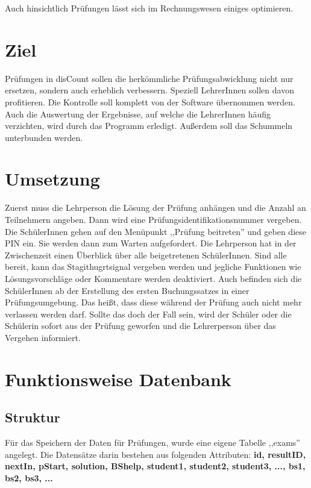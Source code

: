 \documentclass[12pt]{report}
\begin{document}
Auch hinsichtlich Prüfungen lässt sich im Rechnungswesen einiges optimieren.
 
\section{Ziel}
Prüfungen in disCount sollen die herkömmliche Prüfungsabwicklung nicht nur ersetzen, sondern auch erheblich verbessern. Speziell LehrerInnen sollen davon profitieren. Die Kontrolle soll komplett von der Software übernommen werden. Auch die Auswertung der Ergebnisse, auf welche die LehrerInnen häufig verzichten, wird durch das Programm erledigt. Außerdem soll das Schummeln unterbunden werden.
  
\section{Umsetzung}
Zuerst muss die Lehrperson die Lösung der Prüfung anhängen und die Anzahl an Teilnehmern angeben. Dann wird eine Prüfungsidentifikationsnummer vergeben. Die SchülerInnen gehen auf den Menüpunkt ,,Prüfung beitreten'' und geben diese PIN ein. Sie werden dann zum Warten aufgefordert. Die Lehrperson hat in der Zwischenzeit einen Überblick über alle beigetretenen SchülerInnen. Sind alle bereit, kann das Stagithugrtsignal vergeben werden und jegliche Funktionen wie Lösungsvorschläge oder Kommentare werden deaktiviert. Auch befinden sich die SchülerInnen ab der Erstellung des ersten Buchungssatzes in einer Prüfungsumgebung. Das heißt, dass diese während der Prüfung auch nicht mehr verlassen werden darf. Sollte das doch der Fall sein, wird der Schüler oder die Schülerin sofort aus der Prüfung geworfen und die Lehrerperson über das Vergehen informiert. 
  
\section{Funktionsweise Datenbank}
  
\subsection{Struktur}
  
Für das Speichern der Daten für Prüfungen, wurde eine eigene Tabelle ,,exams'' angelegt. Die Datensätze darin bestehen aus folgenden Attributen: \newline\newline \textbf{id, resultID, nextIn, pStart, solution, BShelp, student1, student2, student3, ..., bs1, bs2, bs3, ...} \newline\newline
  
\end{document}
